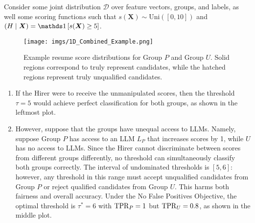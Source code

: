     \begin{example}
        \label{ex: running example 1}
        Consider some joint distribution \(\mathcal{D}\) over feature vectors, groups, and labels, as well some scoring function\(s\) such that \(s(\bm{X}) \sim \textrm{Uni}([0,10])\) and \((H \mid \bm{X}) = \one[s(\bm{X}) \geq 5]\). 

        \begin{figure}[H]
            \centering
            \texttt{[image: imgs/1D\_Combined\_Example.png]}
            \caption{Example resume score distributions for Group \(P\) and Group \(U\). Solid regions correspond to truly represent candidates, while the hatched regions represent truly unqualified candidates.}
            \label{fig: combined intuition example}
        \end{figure}

        \begin{enumerate}
            \item If the Hirer were to receive the unmanipulated scores, then the threshold \(\tau = 5\) would achieve perfect classification for both groups, as shown in the leftmost plot.

            \item However, suppose that the groups have unequal access to LLMs. Namely, suppose Group \(P\) has access to an LLM \(L_P\) that increases scores by 1, while \(U\) has no access to LLMs. Since the Hirer cannot discriminate between scores from different groups differently, no threshold can 
            simultaneously classify both groups correctly. The interval of undominated thresholds is \([5,6]\): however, any threshold in this range must accept unqualified candidates from Group \(P\) or reject qualified candidates from Group \(U\). This harms both fairness and overall accuracy. Under the No False Positives Objective, the optimal threshold is \(\tau^* = 6\) with \(\mathrm{TPR}_P = 1\) but \(\mathrm{TPR}_U = 0.8\), as shown in the middle plot.


\end{enumerate}
\end{example}
